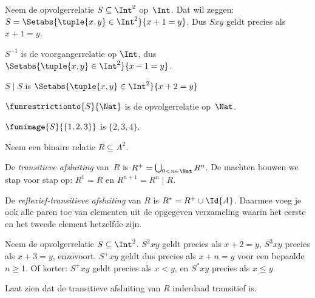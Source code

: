 \documentclass[openany]{memoir}
\begin{document}
\begin{ex}
Neem de opvolgerrelatie $S \subseteq \Int^2$ op~$\Int$. Dat wil zeggen:
$S = \Setabs{\tuple{x, y} \in \Int^2}{x + 1 = y}$. Dus $Sxy$ geldt precies
als $x + 1 = y$.

$S^{-1}$ is de voorgangerrelatie op $\Int$, dus
$\Setabs{\tuple{x,y}\in\Int^2}{x -1 =y}$.

$S\mid S$ is
$ \Setabs{\tuple{x,y}\in\Int^2}{x + 2 =y}$

$\funrestrictionto{S}{\Nat}$ is de opvolgerrelatie op~$\Nat$.

$\funimage{S}{\{1,2,3\}}$ is $\{2, 3, 4\}$.
\end{ex}

\begin{defn}Neem een binaire relatie $R \subseteq A^2$.
	
De \emph{transitieve afsluiting} van~$R$ is $R^+ = \bigcup_{0 < n \in
\Nat} R^n$. De machten bouwen we stap voor stap op: $R^1 = R$ en
$R^{n+1} = R^n \mid R$.

De \emph{reflexief-transitieve afsluiting} van $R$ is $R^* = R^+ \cup
\Id{A}$. Daarmee voeg je ook alle paren toe van elementen uit de opgegeven
verzameling waarin het eerste en het tweede element hetzelfde zijn.
\end{defn}

\begin{ex}
Neem de opvolgerrelatie $S \subseteq \Int^2$. $S^2xy$ geldt precies als
$x + 2 = y$, $S^3xy$ precies als $x + 3 = y$, enzovoort. $S^+xy$ geldt dus
precies als $x + n = y$ voor een bepaalde $n \geq 1$. Of korter: $S^+xy$
geldt precies als $x < y$, en $S^*xy$ precies als $x \le y$.
\end{ex}

\begin{prob}
Laat zien dat de transitieve afsluiting van $R$ inderdaad transitief is.
\end{prob}
\endgroup
\OLEndChapterHook

\begingroup
\def\olfilename{OLP-0020}
\def\olfilepath{content/sets-functions-relations/functions/}
\hypertarget{unit-OLP-0020}{}
\end{document}

